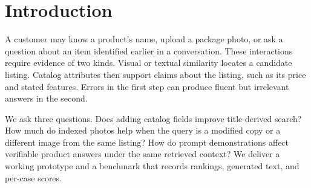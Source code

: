 \documentclass{article}
\begin{document}
\makeatletter
\def\Notice@String{GEN AI Principles, Course Project II. November 2026.}
\def\icmlcorrespondingauthor@text{Sovin Birla}
\makeatother
\printAffiliationsAndNotice{}

\begin{abstract}
A retail support assistant must identify a listing from a photo or a short query before it can answer accurately from catalog metadata. We build a local multimodal retrieval-augmented chatbot using frozen CLIP embeddings, an exact SQLite-backed vector index, Qwen2.5-0.5B-Instruct, and Streamlit. On a seeded 240-product sample of the Amazon Product Dataset 2020, we compare sparse and dense text search, cross-modal image-to-text search, visual indexing, and rank fusion. \AbstractResults{} We also evaluate zero-, two-, and four-shot prompting on historical price lookup and missing-warranty queries. \AbstractQA{} The study separates listing identification from answer quality and exposes the risk of attaching plausible answers to the wrong listing.
\end{abstract}

\section{Introduction}
A customer may know a product's name, upload a package photo, or ask a question about an item identified earlier in a conversation. These interactions require evidence of two kinds. Visual or textual similarity locates a candidate listing. Catalog attributes then support claims about the listing, such as its price and stated features. Errors in the first step can produce fluent but irrelevant answers in the second.

We ask three questions. Does adding catalog fields improve title-derived search? How much do indexed photos help when the query is a modified copy or a different image from the same listing? How do prompt demonstrations affect verifiable product answers under the same retrieved context? We deliver a working prototype and a benchmark that records rankings, generated text, and per-case scores.
\end{document}
